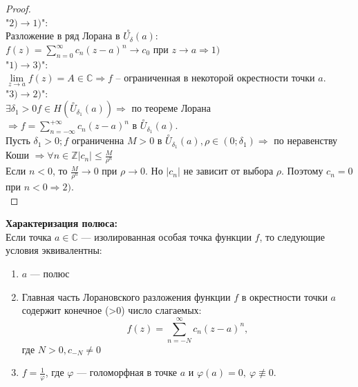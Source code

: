 \begin{proof}
    \ \\
    "$2)\to 1)$":\\
    Разложение в ряд Лорана в $\overset{\circ}{U_{\delta}}(a):$\\
    $f(z)=\sum_{n=0}^\infty c_n(z-a)^n \to c_0$ при $z\to a \Rightarrow 1)$\\[2mm]
    "$1) \to 3)$":\\
    $\lim\limits_{z\to a}f(z)=A\in\mathbb{C} \Rightarrow f$ -- ограниченная в некоторой окрестности точки $a$.\\[2mm]
    "$3) \to 2) $":\\
    $\exists \delta_1 >0 f\in H(\overset{\circ}{U}_{\delta_1}(a)) \Rightarrow$ по теореме Лорана\\
    $\Rightarrow f=\sum_{n=-\infty}^{+\infty}c_n(z-a)^n$ в $\overset{\circ}{U}_{\delta_1}(a).$\\
    Пусть $\delta_1 > 0; f$ ограниченна $M>0$ в $\overset{\circ}{U}_{\delta_1}(a), \rho \in (0; \delta_1)\Rightarrow$ по неравенству Коши $\Rightarrow \forall n\in\mathbb{Z} |c_n|\leq \frac{M}{\rho^n}$\\
    Если $n<0$, то $\frac{M}{\rho^n} \to 0$ при $\rho \to 0$. Но $|c_n|$ не зависит от выбора $\rho$. Поэтому $c_n = 0$ при $n<0 \Rightarrow 2)$.\\[2mm]
\end{proof}

\textbf{Характеризация полюса:}\\
Если точка $a\in \mathbb{C}$ --- изолированная особая точка функции $f$, то следующие условия эквивалентны:
\begin{enumerate}
    \item $a$ --- полюс
    \item Главная часть Лорановского разложения функции $f$ в окрестности точки $a$ содержит конечное (>0) число слагаемых:
    $$f(z)=\sum_{n=-N}^\infty c_n(z-a)^n,$$
    где $N>0, c_{-N}\neq 0$ 
    \item $f=\frac{1}{\varphi}$, где $\varphi$ --- голоморфная в точке $a$ и $\varphi(a) = 0, \ \varphi \not\equiv 0$.
\end{enumerate}

